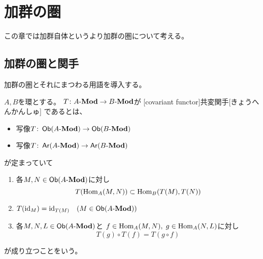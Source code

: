\documentclass[report]{jlreq}
\begin{document}
\chapter{加群の圏}

この章では加群自体というより加群の圏について考える。


%
\section{加群の圏と関手}

加群の圏とそれにまつわる用語を導入する。

\begin{definition}[加群の圏]
    \TODO{}
\end{definition}

\begin{definition}[共変関手]
    $A, B$を環とする。
    $T \colon A\text{-}\mathbf{Mod} \to B\text{-}\mathbf{Mod}$が
    [covariant functor]{共変関手}[きょうへんかんしゅ]
    であるとは、
    \begin{itemize}
        \item 写像$T \colon \operatorname{\mathsf{Ob}}(A\text{-}\mathbf{Mod}) \to \operatorname{\mathsf{Ob}}(B\text{-}\mathbf{Mod})$
        \item 写像$T \colon \operatorname{\mathsf{Ar}}(A\text{-}\mathbf{Mod}) \to \operatorname{\mathsf{Ar}}(B\text{-}\mathbf{Mod})$
    \end{itemize}
    が定まっていて
    \begin{enumerate}
        \item 各$M, N \in \operatorname{\mathsf{Ob}}(A\text{-}\mathbf{Mod})$に対し
            \begin{equation}
                T(\operatorname{Hom}_A(M, N)) \subset \operatorname{Hom}_B(T(M), T(N))
            \end{equation}
        \item $T(\mathrm{id}_M) = \mathrm{id}_{T(M)} \quad (M \in \operatorname{\mathsf{Ob}}(A\text{-}\mathbf{Mod}))$
        \item 各$M, N, L \in \operatorname{\mathsf{Ob}}(A\text{-}\mathbf{Mod})$と
            $f \in \operatorname{Hom}_A(M, N), \; g \in \operatorname{Hom}_A(N, L)$に対し
            \begin{equation}
                T(g) \circ T(f) = T(g \circ f)
            \end{equation}
    \end{enumerate}
    が成り立つことをいう。
\end{definition}
\end{document}
